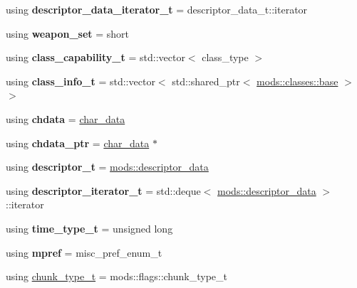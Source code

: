 \begin{DoxyCompactItemize}
\mbox{\label{classmods_1_1player_a7435f35fe5d165ed38c73ab60c1bd73f}} 
using {\bfseries descriptor\+\_\+data\+\_\+iterator\+\_\+t} = descriptor\+\_\+data\+\_\+t\+::iterator
\item 
\mbox{\label{classmods_1_1player_a3b4b8b3c61e722a316014a54cdc077fb}} 
using {\bfseries weapon\+\_\+set} = short
\item 
\mbox{\label{classmods_1_1player_a8e5f2125a853ff189fa1bd97985e3395}} 
using {\bfseries class\+\_\+capability\+\_\+t} = std\+::vector$<$ class\+\_\+type $>$
\item 
\mbox{\label{classmods_1_1player_a32ed361204004f1300835755242fda58}} 
using {\bfseries class\+\_\+info\+\_\+t} = std\+::vector$<$ std\+::shared\+\_\+ptr$<$ \hyperlink{structmods_1_1classes_1_1base}{mods\+::classes\+::base} $>$ $>$
\item 
\mbox{\label{classmods_1_1player_a5d6182011d6c71b86d305cbbf2ad5a82}} 
using {\bfseries chdata} = \hyperlink{structchar__data}{char\+\_\+data}
\item 
\mbox{\label{classmods_1_1player_a139f30733177426d3947a28348353854}} 
using {\bfseries chdata\+\_\+ptr} = \hyperlink{structchar__data}{char\+\_\+data} $\ast$
\item 
\mbox{\label{classmods_1_1player_aa511c83b7a662ce372ac9cfc1474408b}} 
using {\bfseries descriptor\+\_\+t} = \hyperlink{structmods_1_1descriptor__data}{mods\+::descriptor\+\_\+data}
\item 
\mbox{\label{classmods_1_1player_afd13fc7776eb3cfd97113e5e5e67f4c2}} 
using {\bfseries descriptor\+\_\+iterator\+\_\+t} = std\+::deque$<$ \hyperlink{structmods_1_1descriptor__data}{mods\+::descriptor\+\_\+data} $>$\+::iterator
\item 
\mbox{\label{classmods_1_1player_adeef9857b23167853dbd20e7ac016203}} 
using {\bfseries time\+\_\+type\+\_\+t} = unsigned long
\item 
\mbox{\label{classmods_1_1player_aa432d0791d36f2771613636390703ce6}} 
using {\bfseries mpref} = misc\+\_\+pref\+\_\+enum\+\_\+t
\item 
using \hyperlink{classmods_1_1player_a98e6f1c1529e3034d1c6e9a48475bc6b}{chunk\+\_\+type\+\_\+t} = mods\+::flags\+::chunk\+\_\+type\+\_\+t
\end{DoxyCompactItemize}
